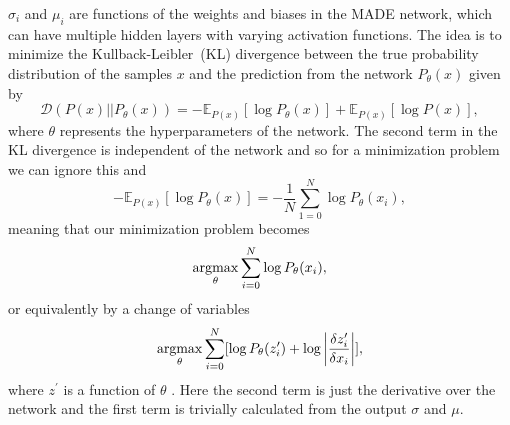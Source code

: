 $\sigma_i$ and $\mu_i$ are functions of the weights and biases in the MADE network, which can have multiple hidden layers with varying activation functions.%
The idea is to minimize the Kullback-Leibler~(KL) divergence between the true probability distribution of the samples $x$ and the prediction from the network $P_\theta(x)$ given by
\begin{equation}
    \mathcal{D} (P(x)||P_{\theta}(x)) = -\mathbb{E}_{P(x)}[\log P_\theta(x)] + \mathbb{E}_{P(x)}[\log P(x)],
\end{equation}
where $\theta$ represents the hyperparameters of the network. The second term in the KL divergence is independent of the network and so for a minimization problem we can ignore this and
\begin{equation}
    -\mathbb{E}_{P(x)}[\log P_\theta(x)] = -\frac{1}{N} \sum_{1=0}^N \log P_\theta(x_i),
\end{equation}
meaning that our minimization problem becomes
\begin{equation}
    \operatorname*{argmax}_\theta \sum^N_{i=0} \log P_\theta(x_i),
\end{equation}
or equivalently by a change of variables
\begin{equation}
    \operatorname*{argmax}_\theta \sum_{i=0}^N [\log P_\theta(z_i^\prime) + \log \bigg|\frac{\delta z_i^\prime}{\delta x_i}\bigg|],
\end{equation}
where $z^\prime$ is a function of $\theta$ \cite{Alsing2019}. Here the second term is just the derivative over the network and the first term is trivially calculated from the output $\sigma$ and $\mu$.

